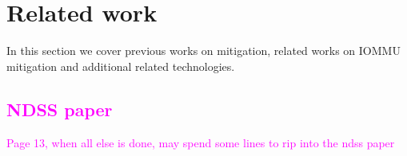 \begin{comment}
\section{RDMA}
Remote DMA(RDMA)\footnote{Member Companies of Openfabrics alliance are mostly behind these technologies \url{https://www.openfabrics.org/}} is a set of protocols(Infiniband,IWARP,RoCE) that facilitate access to the main memory of a remote machines. We wanted to see if some of the attacks could be perpetrated via a malicious peer.  
We didn't find any risks associated with RDMA, other than the risks associated with device drivers, listed in this paper. The ipoib driver is one such driver, one which also maps \shinfo. A malicious device is still needed, as the post\_send/post\_receive API used by the ipoib driver is similar in function to the usual way NICs function; namely a remote user can't pick where to write or choose to write more than once to the same address. These kinds of operations are supported by rdma\_read/write API; which provides the peer with the ability to read/write from/to a specified addresses. We didn't find any uses for this kind of API in the Linux kernel. With post\_send/post\_receive API, the remote host can only modify legitimate memory buffers; and thus can't take advantage of sub-page vulnerabilities.
\textcolor{red}{Am I answering a question that no one asked?}
\end{comment}

\section{Related work}
In this section we cover previous works on mitigation, related works on IOMMU mitigation and additional related technologies.
\subsection{\textcolor{magenta}{NDSS paper}}
\textcolor{magenta}{Page 13, when all else is done, may spend some lines to rip into the ndss paper}

